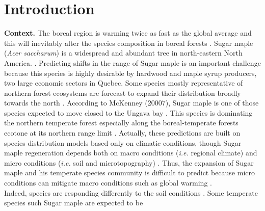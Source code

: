 


\newpage
\setcounter{page}{1}

\section{Introduction}

\textbf{Context.}  The boreal region is warming twice as fast as the global
average and  this will inevitably alter the species composition in boreal
forests \cite{Scheffer2012,Hughes2000,Lafleur2010}. Sugar maple (\textit{Acer
saccharum}) is a widespread and abundant tree in north-eastern North America.
\cite{Graignic2013,Messaoud2007,Kellman2004,Barras1998}. Predicting shifts in
the range of Sugar maple is an important challenge because this species is
highly desirable by hardwood and maple syrup producers, two large economic
sectors in Quebec. Some species mostly representative of northern forest
ecosystems are forecast to expand their distribution broadly towards the north
\cite{Sciences2014,Iverson2002}. According to McKenney (20007), Sugar maple is
one of those species expected to move closed to the Ungava bay
\cite{Sciences2014}. This species is dominating the northern temperate forest
especially along the boreal-temperate forests ecotone at its northern range
limit \cite{Barras1998}. Actually, these predictions are built on species
distribution models based only on climatic conditions, though Sugar maple
regeneration depends both on macro conditions (\textit{i.e.} regional climate)
and micro conditions (\textit{i.e.} soil and microtopography)
\cite{Graignic2013,Lafleur2010}. Thus, the expansion of Sugar maple and his
temperate species community is difficult to predict because micro conditions can
mitigate macro conditions such as global warming \cite{DeFrenne2013}.\\

Indeed, species are responding differently to the soil conditions \cite{Lafleur2010}. Some
temperate species such Sugar maple are expected to be   

